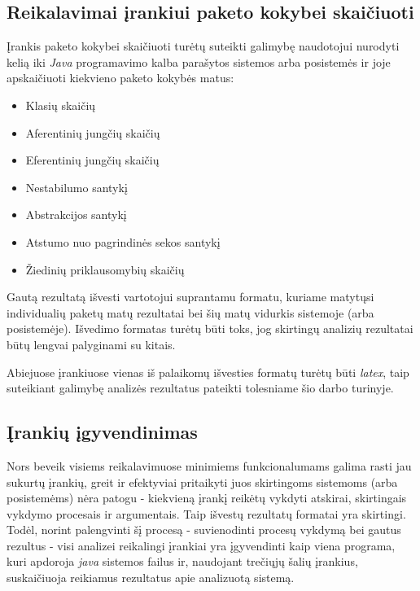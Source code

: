 \subsection{Reikalavimai įrankiui paketo kokybei skaičiuoti}
Įrankis paketo kokybei skaičiuoti turėtų suteikti galimybę naudotojui nurodyti kelią iki \textit{Java} programavimo kalba parašytos sistemos arba posistemės ir joje
apskaičiuoti kiekvieno paketo kokybės matus:
\begin{itemize}
    \item Klasių skaičių
    \item Aferentinių jungčių skaičių
    \item Eferentinių jungčių skaičių
    \item Nestabilumo santykį
    \item Abstrakcijos santykį
    \item Atstumo nuo pagrindinės sekos santykį
    \item Žiedinių priklausomybių skaičių
\end{itemize}
Gautą rezultatą išvesti vartotojui suprantamu formatu, kuriame matytųsi individualių paketų matų rezultatai bei šių matų vidurkis sistemoje (arba posistemėje).
Išvedimo formatas turėtų būti toks, jog skirtingų analizių rezultatai būtų lengvai palyginami su kitais.

Abiejuose įrankiuose vienas iš palaikomų išvesties formatų turėtų būti \textit{latex}, taip suteikiant galimybę analizės rezultatus pateikti tolesniame šio darbo turinyje.

\subsection{Įrankių įgyvendinimas}
Nors beveik visiems reikalavimuose minimiems funkcionalumams galima rasti jau sukurtų įrankių, greit ir efektyviai pritaikyti juos skirtingoms sistemoms
(arba posistemėms) nėra patogu - kiekvieną įrankį reikėtų vykdyti atskirai, skirtingais vykdymo procesais ir argumentais.
Taip išvestų rezultatų formatai yra skirtingi.
Todėl, norint palengvinti šį procesą - suvienodinti procesų vykdymą bei gautus rezultus - visi analizei reikalingi įrankiai yra įgyvendinti kaip viena programa, kuri
apdoroja \textit{java} sistemos failus ir, naudojant trečiųjų šalių įrankius, suskaičiuoja reikiamus rezultatus apie analizuotą sistemą.

